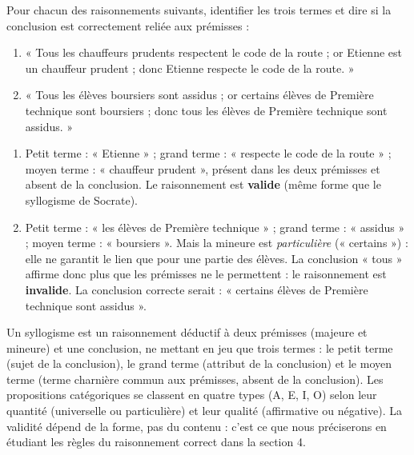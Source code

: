 \documentclass[11pt]{article}
\begin{document}
\begin{exercice}
Pour chacun des raisonnements suivants, identifier les trois termes et dire si la conclusion est correctement reliée aux prémisses :
\begin{enumerate}
\item « Tous les chauffeurs prudents respectent le code de la route ; or Etienne est un chauffeur prudent ; donc Etienne respecte le code de la route. »
\item « Tous les élèves boursiers sont assidus ; or certains élèves de Première technique sont boursiers ; donc tous les élèves de Première technique sont assidus. »
\end{enumerate}
\end{exercice}

\begin{corrige}[Exercice]
\begin{enumerate}
\item Petit terme : « Etienne » ; grand terme : « respecte le code de la route » ; moyen terme : « chauffeur prudent », présent dans les deux prémisses et absent de la conclusion. Le raisonnement est \textbf{valide} (même forme que le syllogisme de Socrate).
\item Petit terme : « les élèves de Première technique » ; grand terme : « assidus » ; moyen terme : « boursiers ». Mais la mineure est \emph{particulière} (« certains ») : elle ne garantit le lien que pour une partie des élèves. La conclusion « tous » affirme donc plus que les prémisses ne le permettent : le raisonnement est \textbf{invalide}. La conclusion correcte serait : « certains élèves de Première technique sont assidus ».
\end{enumerate}
\end{corrige}

\begin{aretenir}
Un syllogisme est un raisonnement déductif à deux prémisses (majeure et mineure) et une conclusion, ne mettant en jeu que trois termes : le petit terme (sujet de la conclusion), le grand terme (attribut de la conclusion) et le moyen terme (terme charnière commun aux prémisses, absent de la conclusion). Les propositions catégoriques se classent en quatre types (A, E, I, O) selon leur quantité (universelle ou particulière) et leur qualité (affirmative ou négative). La validité dépend de la forme, pas du contenu : c'est ce que nous préciserons en étudiant les règles du raisonnement correct dans la section 4.
\end{aretenir}
\end{document}
